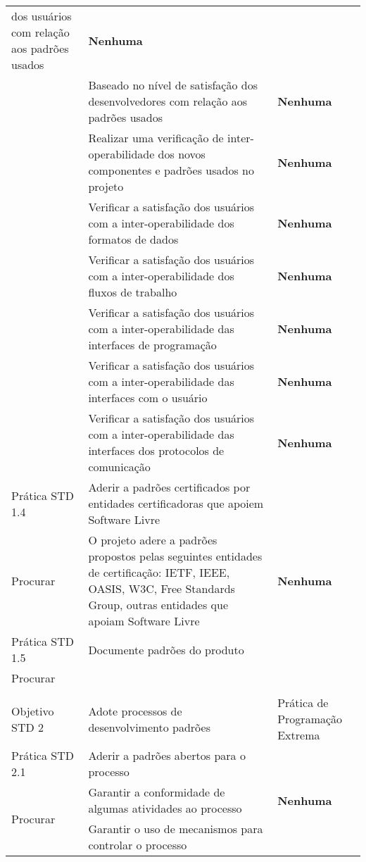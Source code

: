 \begin{longtable}{|p{2cm}|p{7cm}|p{7cm}|}
  dos usuários com relação aos padrões usados &
  \textbf{Nenhuma} \\
  \cline{2-3} & Baseado no nível de satisfação dos desenvolvedores com
  relação aos padrões usados& \textbf{Nenhuma} \\
  \cline{2-3} & Realizar uma verificação de inter-operabilidade dos
  novos componentes e padrões usados no projeto & \textbf{Nenhuma} \\
  \cline{2-3} & Verificar a satisfação dos usuários com a
  inter-operabilidade dos formatos de dados & \textbf{Nenhuma} \\
  \cline{2-3} & Verificar a satisfação dos usuários com a
  inter-operabilidade dos fluxos de trabalho & \textbf{Nenhuma} \\
  \cline{2-3} & Verificar a satisfação dos usuários com a
  inter-operabilidade das interfaces de programação & \textbf{Nenhuma}
  \\
  \cline{2-3} & Verificar a satisfação dos usuários com a
  inter-operabilidade das interfaces com o usuário & \textbf{Nenhuma}
  \\
  \cline{2-3} & Verificar a satisfação dos usuários com a
  inter-operabilidade das interfaces dos protocolos de comunicação &
  \textbf{Nenhuma} \\
  \hline \cellcolor[gray]{0.9} Prática STD 1.4 & \cellcolor[gray]{0.9}
  Aderir a padrões certificados por entidades certificadoras que
  apoiem Software Livre & \\
  \hline \multirow{1}{*}{Procurar} & O projeto adere a padrões
  propostos pelas seguintes entidades de certificação: IETF, IEEE,
  OASIS, W3C, Free Standards Group, outras entidades que apoiam
  Software Livre &
  \textbf{Nenhuma} \\
  \hline \cellcolor[gray]{0.9} Prática STD 1.5 & \cellcolor[gray]{0.9}
  Documente padrões do produto & \\
  \hline \multirow{1}{*}{Procurar} & & \\
  \hline
  & & \\
  \hline \cellcolor[gray]{0.6} Objetivo STD 2 & \cellcolor[gray]{0.6}
  Adote processos de desenvolvimento padrões & Prática de Programação Extrema \\
  \hline \cellcolor[gray]{0.9} Prática STD 2.1 & \cellcolor[gray]{0.9}
  Aderir a padrões abertos para o processo & \\
  \hline \multirow{2}{*}{Procurar} & Garantir a conformidade de
  algumas atividades ao processo &
  \textbf{Nenhuma} \\
  \cline{2-3} & Garantir o uso de mecanismos para controlar o processo

\end{longtable}
